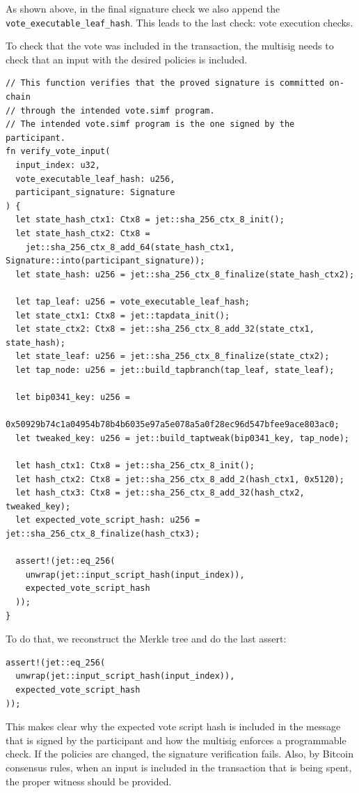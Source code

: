 \documentclass[11pt]{article}
\begin{document}
As shown above, in the final signature check we also append the \texttt{vote\_executable\_leaf\_hash}.
This leads to the last check: vote execution checks.

To check that the vote was included in the transaction, the multisig needs to check that an input with the desired policies is included.

\begin{lstlisting}
// This function verifies that the proved signature is committed on-chain
// through the intended vote.simf program.
// The intended vote.simf program is the one signed by the participant.
fn verify_vote_input(
  input_index: u32,
  vote_executable_leaf_hash: u256,
  participant_signature: Signature
) {
  let state_hash_ctx1: Ctx8 = jet::sha_256_ctx_8_init();
  let state_hash_ctx2: Ctx8 =
    jet::sha_256_ctx_8_add_64(state_hash_ctx1, Signature::into(participant_signature));
  let state_hash: u256 = jet::sha_256_ctx_8_finalize(state_hash_ctx2);

  let tap_leaf: u256 = vote_executable_leaf_hash;
  let state_ctx1: Ctx8 = jet::tapdata_init();
  let state_ctx2: Ctx8 = jet::sha_256_ctx_8_add_32(state_ctx1, state_hash);
  let state_leaf: u256 = jet::sha_256_ctx_8_finalize(state_ctx2);
  let tap_node: u256 = jet::build_tapbranch(tap_leaf, state_leaf);

  let bip0341_key: u256 =
    0x50929b74c1a04954b78b4b6035e97a5e078a5a0f28ec96d547bfee9ace803ac0;
  let tweaked_key: u256 = jet::build_taptweak(bip0341_key, tap_node);

  let hash_ctx1: Ctx8 = jet::sha_256_ctx_8_init();
  let hash_ctx2: Ctx8 = jet::sha_256_ctx_8_add_2(hash_ctx1, 0x5120);
  let hash_ctx3: Ctx8 = jet::sha_256_ctx_8_add_32(hash_ctx2, tweaked_key);
  let expected_vote_script_hash: u256 = jet::sha_256_ctx_8_finalize(hash_ctx3);

  assert!(jet::eq_256(
    unwrap(jet::input_script_hash(input_index)),
    expected_vote_script_hash
  ));
}
\end{lstlisting}

To do that, we reconstruct the Merkle tree and do the last assert:

\begin{lstlisting}
assert!(jet::eq_256(
  unwrap(jet::input_script_hash(input_index)),
  expected_vote_script_hash
));
\end{lstlisting}

This makes clear why the expected vote script hash is included in the message that is signed by the participant and how the multisig enforces a programmable check.
If the policies are changed, the signature verification fails.
Also, by Bitcoin consensus rules, when an input is included in the transaction that is being spent, the proper witness should be provided.
\end{document}
